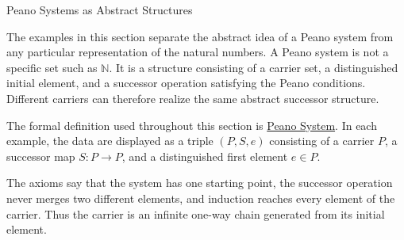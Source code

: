 \label{sec:examples-of-peano-systems}

\begin{topicbox}{Peano Systems as Abstract Structures}
\begin{exposition}
The examples in this section separate the abstract idea of a Peano system from
any particular representation of the natural numbers. A Peano system is not a
specific set such as $\mathbb{N}$. It is a structure consisting of a carrier
set, a distinguished initial element, and a successor operation satisfying the
Peano conditions. Different carriers can therefore realize the same abstract
successor structure.
\end{exposition}

\begin{remark*}
The formal definition used throughout this section is
\hyperref[def:peano-system]{Peano System}. In each example, the data are
displayed as a triple $(P,S,e)$ consisting of a carrier $P$, a successor map
$S:P\to P$, and a distinguished first element $e\in P$.
\end{remark*}

\begin{remark*}[Interpretation]
The axioms say that the system has one starting point, the successor operation
never merges two different elements, and induction reaches every element of the
carrier. Thus the carrier is an infinite one-way chain generated from its
initial element.
\end{remark*}
\end{topicbox}

